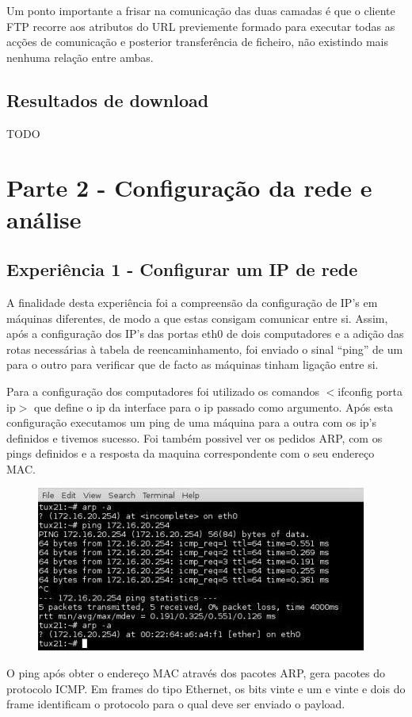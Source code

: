 \documentclass[a4paper]{article}
\begin{document}
Um ponto importante a frisar na comunicação das duas camadas é que o cliente FTP recorre aos atributos do URL previemente formado para executar todas as acções de comunicação e posterior transferência de ficheiro, não existindo mais nenhuma relação entre ambas.

\subsection{Resultados de download}
TODO

\section{Parte 2 - Configuração da rede e análise}
\subsection{Experiência 1 - Configurar um IP de rede}
A finalidade desta experiência foi a compreensão da configuração de IP’s em máquinas diferentes, de modo a que estas consigam comunicar entre si. Assim, após a configuração dos IP’s das portas eth0 de dois computadores e a adição das rotas necessárias à tabela de reencaminhamento, foi enviado o sinal “ping” de um para o outro para verificar que de facto as máquinas tinham ligação entre si.

Para a configuração dos computadores foi utilizado os comandos $<$ifconfig porta ip$>$ que define o ip da interface para o ip passado como argumento. Após esta configuração executamos um ping de uma máquina para a outra com os ip’s definidos e tivemos sucesso. Foi também possivel ver os pedidos ARP, com os pings definidos e a resposta da maquina correspondente com o seu endereço MAC.

\begin{figure}[h!]
\centering
\includegraphics[scale=0.5]{res/image1.jpg}
\end{figure}

O ping após obter o endereço MAC através dos pacotes ARP, gera pacotes do protocolo ICMP. Em frames do tipo Ethernet, os bits vinte e um e vinte e dois do frame identificam o protocolo para o qual deve ser enviado o payload.
\end{document}
